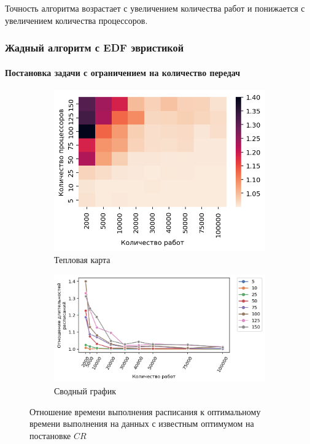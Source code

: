 Точность алгоритма возрастает с увеличением количества работ и понижается с увеличением количества процессоров.

\subsubsection{Жадный алгоритм с EDF эвристикой}

\paragraph{Постановка задачи с ограничением на количество передач}

\begin{figure}[!htbp]
    \centering
    \begin{subfigure}{0.49\textwidth}
        \includegraphics[width=\textwidth]{imgs/ideal_1/CR_EDF/th.png}
        \caption{Тепловая карта}
        \label{fig:CR-EDF-times-heatmap}
    \end{subfigure}
    \hfill
    \begin{subfigure}{0.49\textwidth}
        \includegraphics[width=\textwidth]{imgs/ideal_1/CR_EDF/gr_amalgamated.png}
        \caption{Сводный график} 
        \label{fig:CR-EDF-times-compiled} 
    \end{subfigure}
    \caption{Отношение времени выполнения расписания к оптимальному времени выполнения на данных с известным оптимумом на постановке $CR$}
\end{figure}

